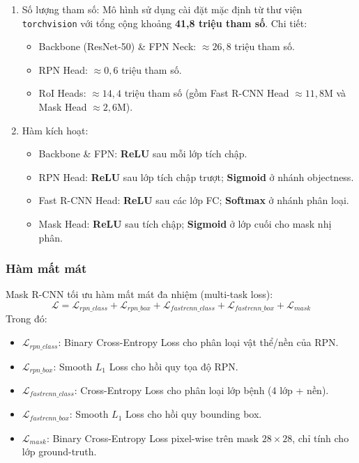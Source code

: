 \begin{enumerate}
    \item Số lượng tham số:
          Mô hình sử dụng cài đặt mặc định từ thư viện \texttt{torchvision} với tổng cộng khoảng \textbf{41,8 triệu tham số}. Chi tiết:
          \begin{itemize}
              \item Backbone (ResNet-50) \& FPN Neck: $\approx 26,8$ triệu tham số.
              \item RPN Head: $\approx 0,6$ triệu tham số.
              \item RoI Heads: $\approx 14,4$ triệu tham số (gồm Fast R-CNN Head $\approx 11,8$M và Mask Head $\approx 2,6$M).
          \end{itemize}

    \item Hàm kích hoạt:
          \begin{itemize}
              \item Backbone \& FPN: \textbf{ReLU} sau mỗi lớp tích chập.
              \item RPN Head: \textbf{ReLU} sau lớp tích chập trượt; \textbf{Sigmoid} ở nhánh objectness.
              \item Fast R-CNN Head: \textbf{ReLU} sau các lớp FC; \textbf{Softmax} ở nhánh phân loại.
              \item Mask Head: \textbf{ReLU} sau tích chập; \textbf{Sigmoid} ở lớp cuối cho mask nhị phân.
          \end{itemize}
\end{enumerate}

\subsubsection{Hàm mất mát}
Mask R-CNN tối ưu hàm mất mát đa nhiệm (multi-task loss):
\begin{equation}
    \mathcal{L} = \mathcal{L}_{rpn\_class} + \mathcal{L}_{rpn\_box} + \mathcal{L}_{fastrcnn\_class} + \mathcal{L}_{fastrcnn\_box} + \mathcal{L}_{mask}
\end{equation}
Trong đó:
\begin{itemize}
    \item $\mathcal{L}_{rpn\_class}$: Binary Cross-Entropy Loss cho phân loại vật thể/nền của RPN.
    \item $\mathcal{L}_{rpn\_box}$: Smooth $L_1$ Loss cho hồi quy tọa độ RPN.
    \item $\mathcal{L}_{fastrcnn\_class}$: Cross-Entropy Loss cho phân loại lớp bệnh (4 lớp + nền).
    \item $\mathcal{L}_{fastrcnn\_box}$: Smooth $L_1$ Loss cho hồi quy bounding box.
    \item $\mathcal{L}_{mask}$: Binary Cross-Entropy Loss pixel-wise trên mask $28 \times 28$, chỉ tính cho lớp ground-truth.
\end{itemize}

